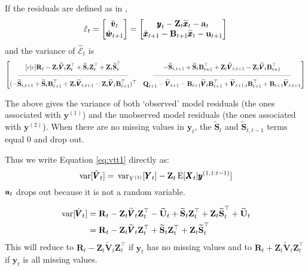\documentclass[]{article}
\def\UPS{\mbox{\boldmath $\Upsilon$}}
\def\XI{\mbox{\boldmath $\Xi$}}
\def\BB{\mbox{$\mathbf B$}}	\def\bb{\mbox{$\mathbf b$}} \def\Bb{\mbox{$\mathbf J$}} \def\Ba{\mbox{$\mathbf L$}} \def\Bm{\UPS}
\def\E{\,\textup{\textrm{E}}}
\def\QQ{\mbox{$\mathbf Q$}}	 \def\qq{\mbox{$\mathbf q$}} \def\Qb{\mbox{$\mathbf G$}}  \def\Qm{\mathbb{Q}}
\def\RR{\mbox{$\mathbf R$}}	 \def\rr{\mbox{$\mathbf r$}} \def\Rb{\mbox{$\mathbf H$}}	\def\Rm{\mathbb{R}}
\def\Ss{\mbox{$\mathbf S$}}
\def\UU{\mbox{$\mathbf U$}}	\def\uu{\mbox{$\mathbf u$}}
\def\VV{\mbox{$\pmb{V}$}}	\def\vv{\mbox{$\pmb{v}$}}
\def\XX{\mbox{$\pmb{X}$}}	\def\xx{\mbox{$\pmb{x}$}}
\def\YY{\mbox{$\pmb{Y}$}}	\def\yy{\mbox{$\pmb{y}$}}
\def\ZZ{\mbox{$\mathbf Z$}}	\def\zz{\mbox{$\mathbf z$}}	\def\Zb{\mbox{$\mathbf M$}} \def\Za{\mbox{$\mathbf N$}} \def\Zm{\XI}
\def\var{\,\textup{\textrm{var}}}
\def\hatxt{\widetilde{\xx}_t}
\def\hatVt{\widetilde{\VV}_t}
\def\hatUt{\widetilde{\UU}_t}
\def\hatSt{\widetilde{\Ss}_t}
\def\hatSttm{\widetilde{\Ss}_{t,t-1}}
\def\hatSttp{\widetilde{\Ss}_{t,t+1}}
\begin{document}
If the residuals are defined as in \citet{Harveyetal1998},
\begin{equation}
\hat{\varepsilon}_t = \begin{bmatrix}\hat{\vv}_t\\ \hat{\ww}_{t+1}\end{bmatrix} =
\begin{bmatrix}\yy_t - \ZZ_t\hatxt-\aa_t\\ \tilde{\xx}_{t+1} - \BB_{t+1}\hatxt-\uu_{t+1} \end{bmatrix}
\end{equation}
and the variance of $\hat{\mathcal{E}}_t$ is
\begin{equation}\label{eqn:jointcondresid2.t1}
\begin{bmatrix}[c|c]
\RR_t - \ZZ_t \hatVt \ZZ_t^\top + \hatSt\ZZ_t^\top + \ZZ_t\hatSt^\top&
- \hatSttp + \hatSt\BB_{t+1}^\top + \ZZ_t\widetilde{\VV}_{t,t+1} - \ZZ_t\hatVt\BB_{t+1}^\top \\
\rule[.5ex]{40ex}{0.25pt} & \rule[.5ex]{50ex}{0.25pt} \\
(- \hatSttp + \hatSt\BB_{t+1}^\top + \ZZ_t\widetilde{\VV}_{t,t+1} - \ZZ_t\hatVt\BB_{t+1}^\top)^\top& 
\QQ_{t+1} - \widetilde{\VV}_{t+1} - \BB_{t+1} \hatVt \BB_{t+1}^\top + \widetilde{\VV}_{t+1,t} \BB_{t+1}^\top + \BB_{t+1}\widetilde{\VV}_{t,t+1} \end{bmatrix}
\end{equation}

The above gives the variance of both `observed' model residuals (the ones associated with $\yy^{(1)}$) and the unobserved model residuals (the ones associated with $\yy^{(2)}$).  
When there are no missing values in $\yy_t$, the $\hatSt$ and $\hatSttm$ terms equal 0 and drop out.



Thus we write Equation \ref{eq:vtt1} directly as:
\begin{equation}\label{eq:vtt1.2}
\var[\hat{\VV}_t] = \var_{Y^{(1)}}[\YY_t] - \ZZ_t\E[\XX_t|\yy^{(1,1:t-1)}]
\end{equation}
$\aa_t$ drops out because it is not a random variable.



\begin{equation}
\begin{split}
\var[\hat{\VV}_t] &= \RR_t - \ZZ_t \hatVt \ZZ_t^\top - \hatUt + \hatSt\ZZ_t^\top + \ZZ_t\hatSt^\top + \hatUt\\
&= \RR_t - \ZZ_t \hatVt \ZZ_t^\top + \hatSt\ZZ_t^\top + \ZZ_t\hatSt^\top
\end{split}
\end{equation}
This will reduce to $\RR_t - \ZZ_t \hatVt \ZZ_t^\top$ if $\yy_t$ has no missing values and to $\RR_t + \ZZ_t \hatVt \ZZ_t^\top$ if $\yy_t$ is all missing values.





\end{document}
